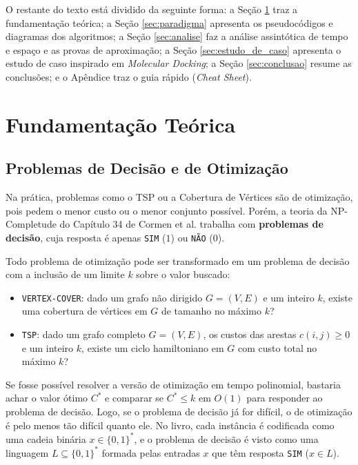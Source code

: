 \documentclass[conference]{IEEEtran}
\theoremstyle{definition}
\theoremstyle{plain}
\begin{document}
O restante do texto está dividido da seguinte forma: a Seção \ref{sec:fundamentacao} traz a fundamentação teórica; a Seção \ref{sec:paradigma} apresenta os pseudocódigos e diagramas dos algoritmos; a Seção \ref{sec:analise} faz a análise assintótica de tempo e espaço e as provas de aproximação; a Seção \ref{sec:estudo_de_caso} apresenta o estudo de caso inspirado em \textit{Molecular Docking}; a Seção \ref{sec:conclusao} resume as conclusões; e o Apêndice traz o guia rápido (\textit{Cheat Sheet}).

\section{Fundamentação Teórica}
\label{sec:fundamentacao}

\subsection{Problemas de Decisão e de Otimização}

Na prática, problemas como o TSP ou a Cobertura de Vértices são de otimização, pois pedem o menor custo ou o menor conjunto possível. Porém, a teoria da NP-Completude do Capítulo 34 de Cormen et al. \cite{cormen2012algoritmos} trabalha com \textbf{problemas de decisão}, cuja resposta é apenas \texttt{SIM} ($1$) ou \texttt{NÃO} ($0$).

Todo problema de otimização pode ser transformado em um problema de decisão com a inclusão de um limite $k$ sobre o valor buscado:
\begin{itemize}
    \item \texttt{VERTEX-COVER}: dado um grafo não dirigido $G = (V, E)$ e um inteiro $k$, existe uma cobertura de vértices em $G$ de tamanho no máximo $k$?
    \item \texttt{TSP}: dado um grafo completo $G = (V, E)$, os custos das arestas $c(i, j) \ge 0$ e um inteiro $k$, existe um ciclo hamiltoniano em $G$ com custo total no máximo $k$?
\end{itemize}

Se fosse possível resolver a versão de otimização em tempo polinomial, bastaria achar o valor ótimo $C^*$ e comparar se $C^* \le k$ em $O(1)$ para responder ao problema de decisão. Logo, se o problema de decisão já for difícil, o de otimização é pelo menos tão difícil quanto ele. No livro, cada instância é codificada como uma cadeia binária $x \in \{0,1\}^*$, e o problema de decisão é visto como uma linguagem $L \subseteq \{0,1\}^*$ formada pelas entradas $x$ que têm resposta \texttt{SIM} ($x \in L$).
\end{document}
